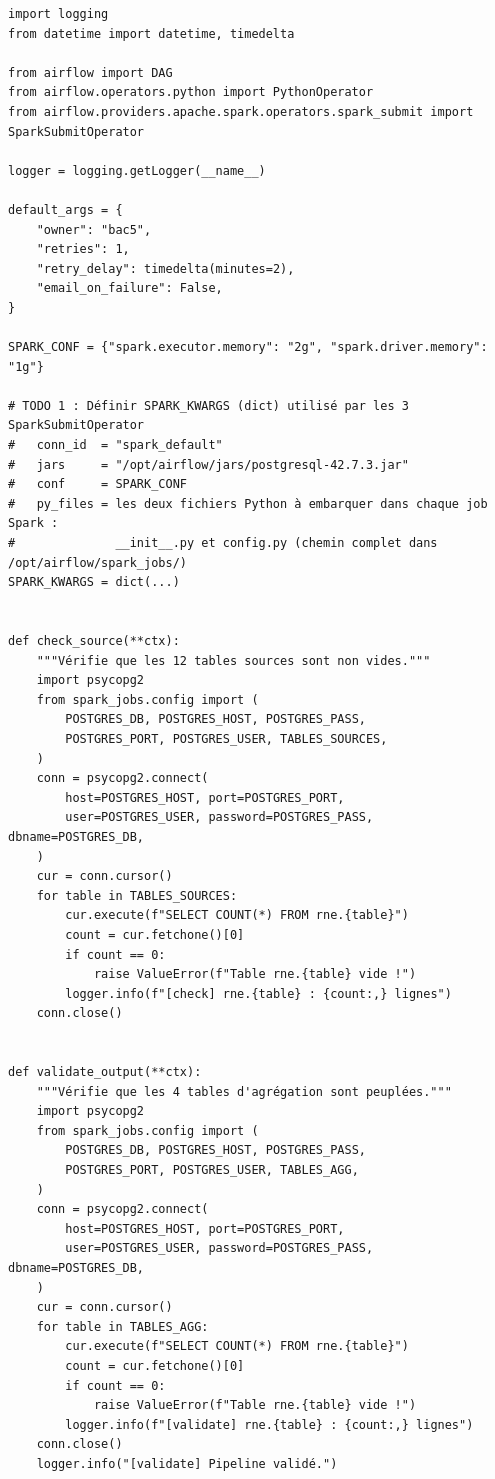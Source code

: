 \documentclass[11pt,a4paper]{article}
\begin{document}
\begin{lstlisting}
import logging
from datetime import datetime, timedelta

from airflow import DAG
from airflow.operators.python import PythonOperator
from airflow.providers.apache.spark.operators.spark_submit import SparkSubmitOperator

logger = logging.getLogger(__name__)

default_args = {
    "owner": "bac5",
    "retries": 1,
    "retry_delay": timedelta(minutes=2),
    "email_on_failure": False,
}

SPARK_CONF = {"spark.executor.memory": "2g", "spark.driver.memory": "1g"}

# TODO 1 : Définir SPARK_KWARGS (dict) utilisé par les 3 SparkSubmitOperator
#   conn_id  = "spark_default"
#   jars     = "/opt/airflow/jars/postgresql-42.7.3.jar"
#   conf     = SPARK_CONF
#   py_files = les deux fichiers Python à embarquer dans chaque job Spark :
#              __init__.py et config.py (chemin complet dans /opt/airflow/spark_jobs/)
SPARK_KWARGS = dict(...)


def check_source(**ctx):
    """Vérifie que les 12 tables sources sont non vides."""
    import psycopg2
    from spark_jobs.config import (
        POSTGRES_DB, POSTGRES_HOST, POSTGRES_PASS,
        POSTGRES_PORT, POSTGRES_USER, TABLES_SOURCES,
    )
    conn = psycopg2.connect(
        host=POSTGRES_HOST, port=POSTGRES_PORT,
        user=POSTGRES_USER, password=POSTGRES_PASS, dbname=POSTGRES_DB,
    )
    cur = conn.cursor()
    for table in TABLES_SOURCES:
        cur.execute(f"SELECT COUNT(*) FROM rne.{table}")
        count = cur.fetchone()[0]
        if count == 0:
            raise ValueError(f"Table rne.{table} vide !")
        logger.info(f"[check] rne.{table} : {count:,} lignes")
    conn.close()


def validate_output(**ctx):
    """Vérifie que les 4 tables d'agrégation sont peuplées."""
    import psycopg2
    from spark_jobs.config import (
        POSTGRES_DB, POSTGRES_HOST, POSTGRES_PASS,
        POSTGRES_PORT, POSTGRES_USER, TABLES_AGG,
    )
    conn = psycopg2.connect(
        host=POSTGRES_HOST, port=POSTGRES_PORT,
        user=POSTGRES_USER, password=POSTGRES_PASS, dbname=POSTGRES_DB,
    )
    cur = conn.cursor()
    for table in TABLES_AGG:
        cur.execute(f"SELECT COUNT(*) FROM rne.{table}")
        count = cur.fetchone()[0]
        if count == 0:
            raise ValueError(f"Table rne.{table} vide !")
        logger.info(f"[validate] rne.{table} : {count:,} lignes")
    conn.close()
    logger.info("[validate] Pipeline validé.")



\end{lstlisting}
\end{document}
